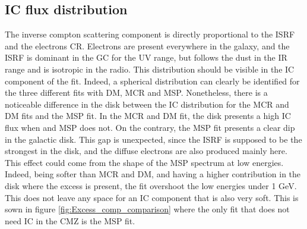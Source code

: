 \subsection{IC flux distribution}
The inverse compton scattering component is directly proportional to the ISRF and the electrons CR. Electrons are present everywhere in the galaxy, and the ISRF is dominant in the GC for the UV range, but follows the dust in the IR range and is isotropic in the radio. This distribution should be visible in the IC component of the fit.
Indeed, a spherical distribution can clearly be identified for the three different fits with DM, MCR and MSP. Nonetheless, there is a noticeable difference in the disk between the IC distribution for the MCR and DM fits and the MSP fit. In the MCR and DM fit, the disk presents a high IC flux when and MSP does not. On the contrary, the MSP fit presents a clear dip in the galactic disk. This gap is unexpected, since the ISRF is supposed to be the strongest in the disk, and the diffuse electrons are also produced mainly here. This effect could come from the shape of the MSP spectrum at low energies. Indeed, being softer than MCR and DM, and having a higher contribution in the disk where the excess is present, the fit overshoot the low energies under 1 GeV. This does not leave any space for an IC component that is also very soft. This is sown in figure \ref{fig:Excess_comp_comparison} where the only fit that does not need IC in the CMZ is the MSP fit.

